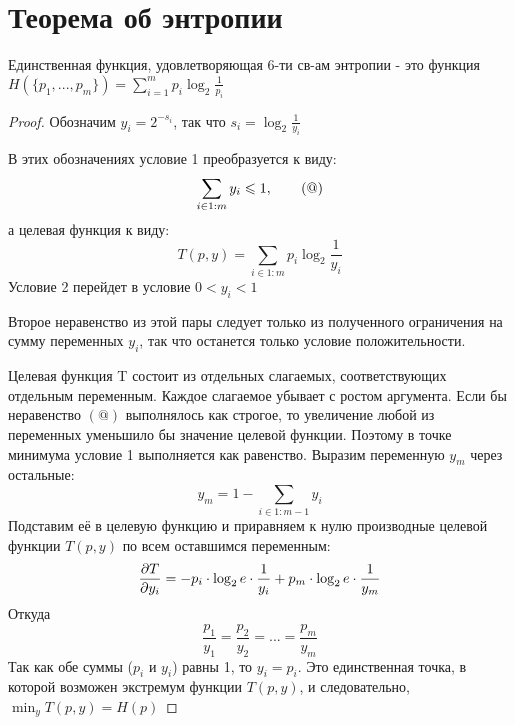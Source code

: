 \documentclass[discrete.tex]{subfiles}
\begin{document}
\section{Теорема об энтропии}
\begin{theorem}
  Единственная функция, удовлетворяющая 6-ти св-ам энтропии - это функция $H(\{p_1,...,p_m\}) = \sum_{i=1}^m p_i \log_2 \frac{1}{p_i}$
\end{theorem}

\begin{proof}
  Обозначим $y_i=2^{-s_i}$, так что $s_i=\log_2 \frac{1}{y_i}$

  В этих обозначениях условие 1 преобразуется к виду:
  \[\sum_{i \in 1:m} y_i \leqslant 1, \qquad (@)\]
  а целевая функция к виду:
  \[T(p,y) = \sum_{i \in 1:m} p_i \log_2 \frac{1}{y_i}\]
  Условие 2 перейдет в условие $0 < y_i < 1$

  Второе неравенство из этой пары следует только из полученного ограничения на сумму переменных $y_i$, так что останется только условие положительности.

  Целевая функция T состоит из отдельных слагаемых, соответствующих отдельным переменным. Каждое слагаемое убывает с ростом аргумента. Если бы неравенство  $(@)$ выполнялось как строгое, то увеличение любой из переменных уменьшило бы значение целевой функции. Поэтому в точке минимума условие 1 выполняется как равенство. Выразим переменную $y_m$ через остальные:
  \[y_m = 1 - \sum_{i \in 1 : m-1} y_i\]
  Подставим её в целевую функцию и приравняем к нулю производные целевой функции $T(p,y)$ по всем оставшимся переменным:
  \[\dfrac{\partial T}{\partial y_i} = -p_i \cdot \log_2 e \cdot \frac{1}{y_i} + p_m \cdot \log_2 e \cdot \frac{1}{y_m}\]
  Откуда
  \[\frac{p_1}{y_1} = \frac{p_2}{y_2} = ... = \frac{p_m}{y_m}\]
  Так как обе суммы ($p_i$ и $y_i$) равны 1, то $y_i=p_i$. Это единственная точка, в которой возможен экстремум функции $T(p,y)$, и следовательно, $\min_y T(p,y) = H(p)$
\end{proof}
\end{document}

